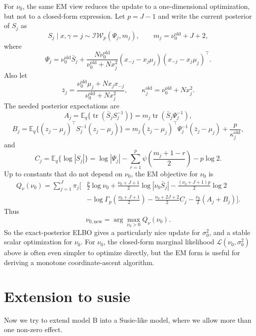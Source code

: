 \documentclass[11pt]{article}
\newcommand{\E}{\mathbb E}
\newcommand{\tr}{\operatorname{tr}}
\begin{document}
For $\nu_0$, the same EM view reduces the update to a one-dimensional
optimization, but not to a closed-form expression. Let $p=J-1$ and write the
current posterior of $S_j$ as
\[
S_j\mid x,\gamma=j
\sim
\mathcal{IW}_p(\Psi_j,m_j),
\qquad
m_j=\nu_0^{\mathrm{old}}+J+2,
\]
where
\[
\Psi_j
=
\nu_0^{\mathrm{old}}\bar S_j+
\frac{N\nu_0^{\mathrm{old}}}{\nu_0^{\mathrm{old}}+Nx_j^2}
(x_{-j}-x_j\mu_j)(x_{-j}-x_j\mu_j)^\top.
\]
Also let
\[
\bar z_j
=
\frac{\nu_0^{\mathrm{old}}\mu_j+Nx_jx_{-j}}
{\nu_0^{\mathrm{old}}+Nx_j^2},
\qquad
\kappa_j^{\mathrm{old}}=\nu_0^{\mathrm{old}}+Nx_j^2.
\]
The needed posterior expectations are
\[
A_j=\E_q\{\tr(\bar S_jS_j^{-1})\}
=
m_j\tr(\bar S_j\Psi_j^{-1}),
\]
\[
B_j=\E_q\{(z_j-\mu_j)^\top S_j^{-1}(z_j-\mu_j)\}
=
m_j(\bar z_j-\mu_j)^\top\Psi_j^{-1}(\bar z_j-\mu_j)
+\frac{p}{\kappa_j^{\mathrm{old}}},
\]
and
\[
C_j=\E_q\{\log|S_j|\}
=
\log|\Psi_j|
-\sum_{r=1}^p \psi\left(\frac{m_j+1-r}{2}\right)
-p\log 2.
\]
Up to constants that do not depend on $\nu_0$, the EM objective for $\nu_0$ is
\begin{align*}
Q_\nu(\nu_0)
=
\sum_{j=1}^J \pi_j
\Bigg[
&\frac{p}{2}\log\nu_0
+\frac{\nu_0+J+1}{2}\log|\nu_0\bar S_j|
-\frac{(\nu_0+J+1)p}{2}\log 2 \\
&-\log\Gamma_p\left(\frac{\nu_0+J+1}{2}\right)
-\frac{\nu_0+2J+2}{2}C_j
-\frac{\nu_0}{2}(A_j+B_j)
\Bigg].
\end{align*}
Thus
\[
\boxed{
\nu_{0,\mathrm{new}}=\arg\max_{\nu_0>0} Q_\nu(\nu_0).
}
\]
So the exact-posterior ELBO gives a particularly nice update for
$\sigma_0^2$, and a stable scalar optimization for $\nu_0$. For $\nu_0$, the
closed-form marginal likelihood $\mathcal L(\nu_0,\sigma_0^2)$ above is often
even simpler to optimize directly, but the EM form is useful for deriving a
monotone coordinate-ascent algorithm.

\section{Extension to susie}
Now we try to extend model B into a Susie-like model, where we allow more than one non-zero effect.
\end{document}

